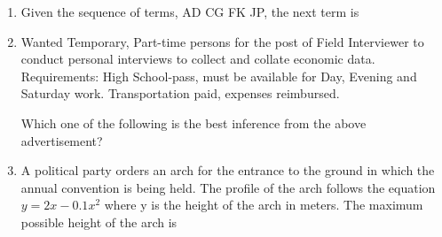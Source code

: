 \documentclass[journal,12pt,onecolumn]{IEEEtran}
\begin{document}
\begin{enumerate}[resume]

    \item Given the sequence of terms, AD CG FK JP, the next term is

          \begin{enumerate}
          \end{enumerate}

    \item Wanted Temporary, Part-time persons for the post of Field Interviewer to conduct personal interviews to collect and collate economic data. Requirements: High School-pass, must be available for Day, Evening and Saturday work. Transportation paid, expenses reimbursed.

          Which one of the following is the best inference from the above advertisement?

          \begin{enumerate}
          \end{enumerate}

    \item A political party orders an arch for the entrance to the ground in which the annual convention is being held. The profile of the arch follows the equation \(y = 2x - 0.1x^2\) where y is the height of the arch in meters. The maximum possible height of the arch is

          \begin{enumerate}
          \end{enumerate}


\end{enumerate}
\end{document}
